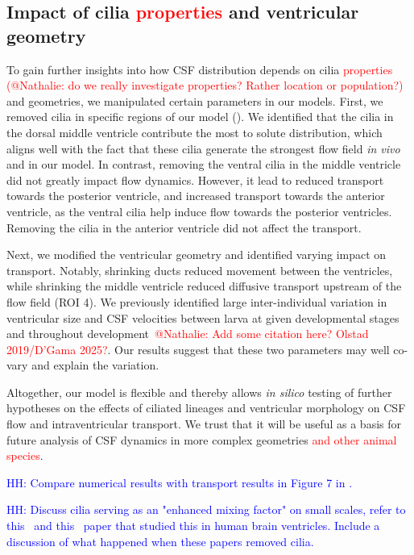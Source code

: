 \documentclass[fleqn]{wlscirep}
\newcommand{\lyng}[1]{\textcolor{blue}{#1}}
\newcommand{\fixme}[1]{\textcolor{red}{#1}}
\begin{document}
\subsection*{Impact of cilia \fixme{properties} and ventricular geometry}
To gain further insights into how CSF distribution depends on cilia \fixme{properties (@Nathalie: do we really
investigate properties? Rather location or population?)} and geometries,
we manipulated certain parameters in our models. First, we removed cilia in specific regions of
our model (). We identified that the cilia in the
dorsal middle ventricle contribute the most to solute distribution, which aligns well with the fact
that these cilia generate the strongest flow field \emph{in vivo} and in our model.
In contrast, removing the ventral cilia in the middle ventricle did not greatly impact flow dynamics.
However, it lead to reduced transport towards the posterior ventricle,
and increased transport towards the anterior ventricle, as the ventral cilia help induce
flow towards the posterior ventricles. Removing the cilia in the anterior ventricle did not affect the transport.

Next, we modified the ventricular geometry and identified varying impact on transport.
Notably, shrinking ducts reduced movement between the ventricles, while shrinking the middle ventricle
reduced diffusive transport upstream of the flow field (ROI 4).
We previously identified large inter-individual variation in ventricular size and
CSF velocities between larva at given developmental stages and throughout
development~\fixme{@Nathalie: Add some citation here? Olstad 2019/D'Gama 2025?}.
Our results suggest that these two parameters may well co-vary and explain the variation.

Altogether, our model is flexible and thereby allows \emph{in silico} testing of
further hypotheses on the effects of ciliated lineages and ventricular morphology on
CSF flow and intraventricular transport.
We trust that it will be useful as a basis for future analysis of
CSF dynamics in more complex geometries \fixme{and other animal species}.

\lyng{HH: Compare numerical results with transport results in Figure 7 in \cite{Olstad2019CiliaryDevelopment}.}

\lyng{HH: Discuss cilia serving as an "enhanced mixing factor" on small scales,
refer to this~\cite{Siyahhan2014FlowVentricles} and this~\cite{Yoshida2022EffectVentricles}
paper that studied this in human brain ventricles.
Include a discussion of what happened when these papers removed cilia.}
\end{document}
